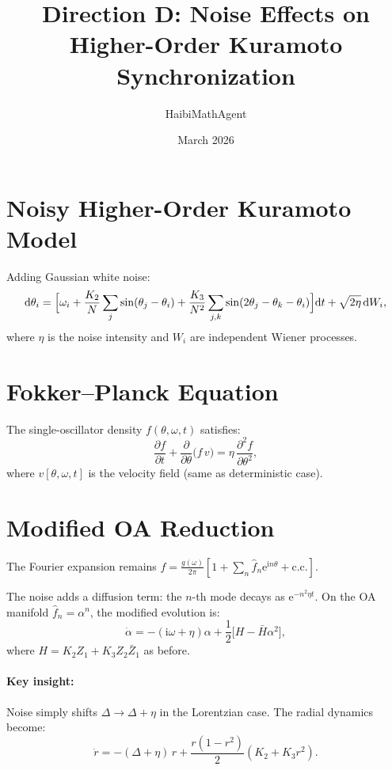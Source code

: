 \documentclass[11pt]{article}
\title{Direction D: Noise Effects on Higher-Order Kuramoto Synchronization}
\author{HaibiMathAgent}
\date{March 2026}
\newcommand{\dd}{\mathrm{d}}
\newcommand{\ii}{\mathrm{i}}
\newcommand{\ee}{\mathrm{e}}
\begin{document}
\maketitle

\section{Noisy Higher-Order Kuramoto Model}

Adding Gaussian white noise:
\begin{equation}
  \dd\theta_i = \Bigl[\omega_i + \frac{K_2}{N}\sum_j\sin(\theta_j-\theta_i)
  + \frac{K_3}{N^2}\sum_{j,k}\sin(2\theta_j-\theta_k-\theta_i)\Bigr]\dd t
  + \sqrt{2\eta}\,\dd W_i,
\end{equation}
where $\eta$ is the noise intensity and $W_i$ are independent Wiener processes.

\section{Fokker--Planck Equation}

The single-oscillator density $f(\theta,\omega,t)$ satisfies:
\begin{equation}
  \frac{\partial f}{\partial t}
  + \frac{\partial}{\partial\theta}\bigl(f\,v\bigr)
  = \eta\,\frac{\partial^2 f}{\partial\theta^2},
\end{equation}
where $v[\theta,\omega,t]$ is the velocity field (same as deterministic case).

\section{Modified OA Reduction}

The Fourier expansion remains $f = \frac{g(\omega)}{2\pi}[1 + \sum_n
\hat{f}_n \ee^{\ii n\theta} + \text{c.c.}]$.

The noise adds a diffusion term: the $n$-th mode decays as $\ee^{-n^2\eta t}$.
On the OA manifold $\hat{f}_n = \alpha^n$, the modified evolution is:
\begin{equation}
  \dot{\alpha} = -(\ii\omega + \eta)\alpha
  + \frac{1}{2}\bigl[H - \bar{H}\alpha^2\bigr],
\end{equation}
where $H = K_2 Z_1 + K_3 Z_2\bar{Z}_1$ as before.

\paragraph{Key insight:} Noise simply shifts $\Delta \to \Delta + \eta$
in the Lorentzian case.  The radial dynamics become:
\begin{equation}
  \boxed{
  \dot{r} = -(\Delta+\eta)\,r + \frac{r(1-r^2)}{2}(K_2 + K_3 r^2).
  }
\end{equation}
\end{document}
